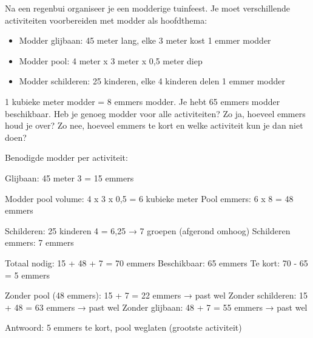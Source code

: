 \begin{opgave}
Na een regenbui organiseer je een modderige tuinfeest. Je moet verschillende
activiteiten voorbereiden met modder als hoofdthema:

\begin{itemize}
\item Modder glijbaan: 45 meter lang, elke 3 meter kost 1 emmer modder
\item Modder pool: 4 meter x 3 meter x 0,5 meter diep
\item Modder schilderen: 25 kinderen, elke 4 kinderen delen 1 emmer modder
\end{itemize}

1 kubieke meter modder = 8 emmers modder. Je hebt 65 emmers modder beschikbaar.
Heb je genoeg modder voor alle activiteiten? Zo ja, hoeveel emmers houd je over?
Zo nee, hoeveel emmers te kort en welke activiteit kun je dan niet doen?
\end{opgave}

\begin{oplossing}
Benodigde modder per activiteit:

Glijbaan: 45 meter \textrm{\textdiv} 3 = 15 emmers

Modder pool volume: 4 x 3 x 0,5 = 6 kubieke meter
Pool emmers: 6 x 8 = 48 emmers

Schilderen: 25 kinderen \textrm{\textdiv} 4 = 6,25 → 7 groepen (afgerond omhoog)
Schilderen emmers: 7 emmers

Totaal nodig: 15 + 48 + 7 = 70 emmers
Beschikbaar: 65 emmers
Te kort: 70 - 65 = 5 emmers

Zonder pool (48 emmers): 15 + 7 = 22 emmers → past wel
Zonder schilderen: 15 + 48 = 63 emmers → past wel
Zonder glijbaan: 48 + 7 = 55 emmers → past wel

Antwoord: 5 emmers te kort, pool weglaten (grootste activiteit)
\end{oplossing}